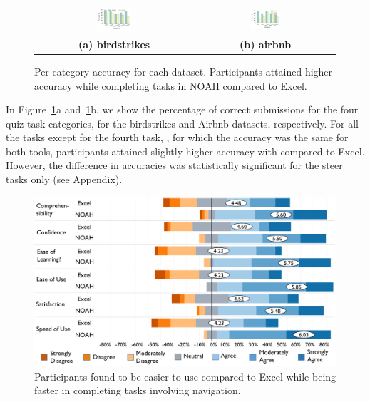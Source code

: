 \begin{figure}[!htbt]
   \centering
\begin{tabular}{c c} %
   \includegraphics[width=0.23\textwidth,trim={18 35 20 20},clip]{images/bird_accC.pdf} &
   \includegraphics[width=0.23\textwidth,trim={18 35 20 10},clip]{images/airbnb_accC.pdf} \\
   \textbf{(a) birdstrikes} & \textbf{(b) airbnb} \\
\end{tabular}
\caption{Per category accuracy for each dataset. Participants attained higher accuracy while completing tasks in NOAH compared to Excel.}
\label{fig:acc}
\end{figure}
In Figure~\ref{fig:acc}a and~\ref{fig:acc}b, 
we show the percentage of correct submissions for the four quiz task categories, 
for the birdstrikes and Airbnb datasets, respectively. 
For all the tasks except for the fourth task, \cmpA, for which the accuracy
was the same for both tools, participants 
attained slightly higher accuracy
with \noah compared to Excel. However, the difference in accuracies was statistically significant 
for the steer tasks only (see Appendix). 

\begin{figure}[!htbt]
    \centering
    \includegraphics[trim=0 0 0 0,clip,width=\linewidth]{images/survey.pdf}
   \caption{Participants found \noah to be easier to use compared to Excel while being faster in completing tasks involving navigation.}
   \label{fig:survey}
 \end{figure}

